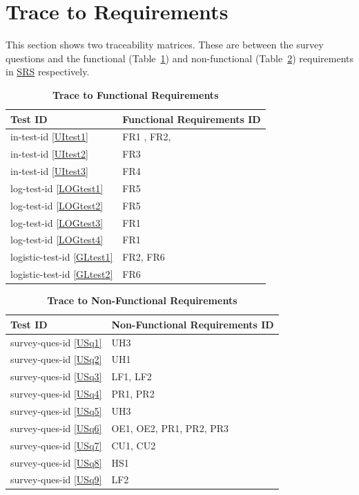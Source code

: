 \documentclass[12pt, titlepage]{article}
\newcommand{\UIref}[1]{in-test-id \ref{#1}}
\newcommand{\LOGref}[1]{log-test-id \ref{#1}}
\newcommand{\GLref}[1]{logistic-test-id \ref{#1}}
\newcommand{\USref}[1]{survey-ques-id \ref{#1}}
\begin{document}
\section{Trace to Requirements}
This section shows two traceability matrices. These are between the survey questions and the functional (Table~\ref{TbFRTrace}) and non-functional (Table~\ref{TbNFRTrace}) requirements in \href{run:../SRS/SRS.pdf}{SRS} respectively.

\begin{table}[H]
\caption{\textbf{Trace to Functional Requirements}} \label{TbFRTrace}
\begin{tabularx}{\textwidth}{p{3cm}X}
\toprule
\textbf{Test ID} & \textbf{Functional Requirements ID} \\
\midrule

\UIref{UItest1} & FR1 , FR2,  \\
\UIref{UItest2} & FR3 \\
\UIref{UItest3} & FR4 \\
\LOGref{LOGtest1} & FR5\\
\LOGref{LOGtest2} & FR5\\
\LOGref{LOGtest3} & FR1\\
\LOGref{LOGtest4}  & FR1\\
\GLref{GLtest1} & FR2, FR6\\
\GLref{GLtest2} & FR6\\

\bottomrule
\end{tabularx}
\end{table}

\begin{table}[H]
\caption{\textbf{Trace to Non-Functional Requirements}} \label{TbNFRTrace}
\begin{tabularx}{\textwidth}{p{3.1cm}X}
\toprule
\textbf{Test ID} & \textbf{Non-Functional Requirements ID} \\
\midrule

\USref{USq1} & UH3 \\
\USref{USq2} & UH1 \\
\USref{USq3} & LF1, LF2 \\
\USref{USq4} & PR1, PR2 \\
\USref{USq5} & UH3\\
\USref{USq6} & OE1, OE2, PR1, PR2, PR3\\
\USref{USq7} & CU1, CU2\\
\USref{USq8} & HS1\\
\USref{USq9} & LF2 \\

\bottomrule
\end{tabularx}
\end{table}
		
\end{document}
